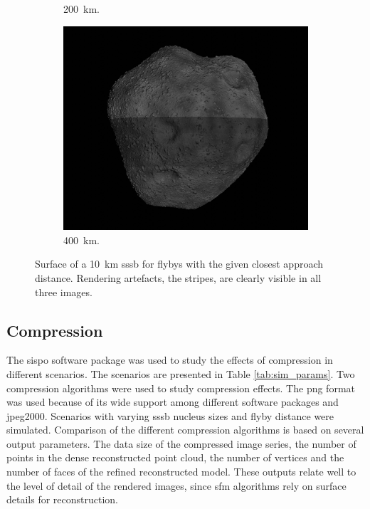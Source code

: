 \begin{figure}[htb]
\begin{subfigure}[b]{0.32\textwidth}
            \caption{\SI{200}{\kilo\meter}.}
            \label{fig:render_artefacts_200}
        \end{subfigure}
        \begin{subfigure}[b]{0.32\textwidth}
            \centering
            \includegraphics[width=\textwidth]{doc/thesis/0_figures/rendering_artefacts/400_10_SssbOnly_2017-08-15T115845-190000.jpg}
            \caption{\SI{400}{\kilo\meter}.}
            \label{fig:render_artefacts_400}
        \end{subfigure}
    \caption{Surface of a \SI{10}{\kilo\meter} \gls{sssb} for flybys with the given closest approach distance. Rendering artefacts, the stripes, are clearly visible in all three images.}
    \label{fig:render_artefacts}
\end{figure}

\subsection{Compression} \label{sec:results_comp}
The \gls{sispo} software package was used to study the effects of compression in different scenarios. The scenarios are presented in Table \ref{tab:sim_params}. Two compression algorithms were used to study compression effects. The \gls{png} format was used because of its wide support among different software packages and \gls{jpeg}2000. Scenarios with varying \gls{sssb} nucleus sizes and flyby distance were simulated. 
Comparison of the different compression algorithms is based on several output parameters. The data size of the compressed image series, the number of points in the dense reconstructed point cloud, the number of vertices and the number of faces of the refined reconstructed model. These outputs relate well to the level of detail of the rendered images, since \gls{sfm} algorithms rely on surface details for reconstruction.

